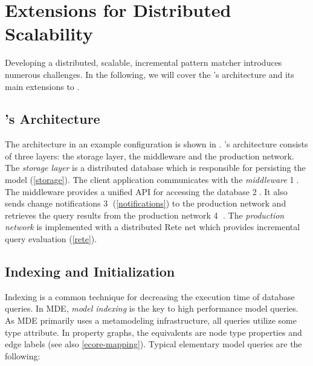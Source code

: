 \section{Extensions for Distributed Scalability}
\label{iqd-architecture}

Developing a distributed, scalable, incremental pattern matcher introduces numerous challenges. In the following, we will cover the \iqd{}'s architecture and its main extensions to \eiq{}.


\subsection{\iqd{}'s Architecture}

The \iqd{} architecture in an example configuration is shown in . \iqd{}'s architecture consists of three layers: the storage layer, the middleware and the production network. 
The \emph{storage layer} is a distributed database which is responsible for persisting the model (\autoref{storage}). 
The client application communicates with the \emph{middleware} \textcircled{1}. The middleware provides a unified API for accessing the database \textcircled{2}. It also sends change notifications \textcircled{3} (\autoref{notifications}) to the production network and retrieves the query results from the production network \textcircled{4} . 
The \emph{production network} is implemented with a distributed Rete net which provides incremental query evaluation (\autoref{rete}).


\subsection{Indexing and Initialization}
\label{indexing}

Indexing is a common technique for decreasing the execution time of database queries. In MDE, \emph{model indexing} is the key to high performance model queries. As MDE primarily uses a metamodeling infrastructure, all queries utilize some type attribute. In property graphs, the equivalents are node type properties and edge labels (see also \autoref{ecore-mapping}). Typical elementary model queries are the following:

